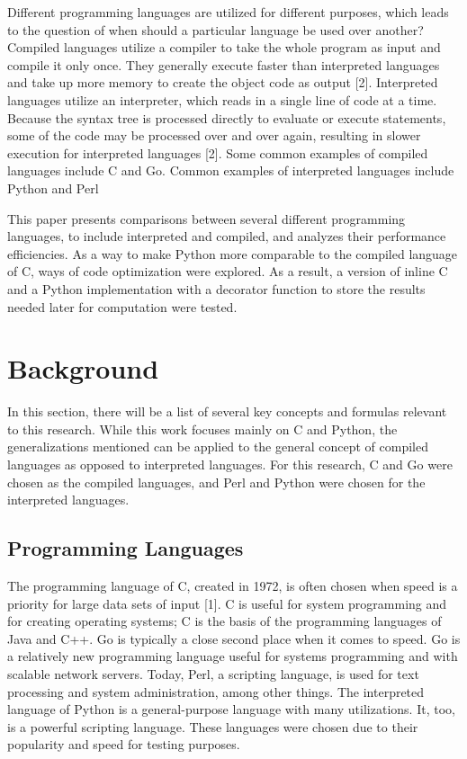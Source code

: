 \documentclass{sig-alternate}
\begin{document}
Different programming languages are utilized for different purposes, which leads to the question of when should a particular language be used over another? Compiled languages utilize a compiler to take the whole program as input and compile it only once. They generally execute faster than interpreted languages and take up more memory to create the object code as output [2]. Interpreted languages utilize an interpreter, which reads in a single line of code at a time. Because the syntax tree is processed directly to evaluate or execute statements, some of the code may be processed over and over again, resulting in slower execution for interpreted languages [2]. Some common examples of compiled languages include C and Go. Common examples of interpreted languages include Python and Perl 

This paper presents comparisons between several different programming languages, to include interpreted and compiled, and analyzes their performance efficiencies. As a way to make Python more comparable to the compiled language of C, ways of code optimization were explored. As a result, a version of inline C and a Python implementation with a decorator function to store the results needed later for computation were tested.

\section{Background}

In this section, there will be a list of several key concepts and formulas relevant to this research. While this work focuses mainly on C and Python, the generalizations mentioned can be applied to the general concept of compiled languages as opposed to interpreted languages. For this research, C and Go were chosen as the compiled languages, and Perl and Python were chosen for the interpreted languages. 

\subsection{Programming Languages}	

The programming language of C, created in 1972, is often chosen when speed is a priority for large data sets of input [1]. C is useful for system programming and for creating operating systems; C is the basis of the programming languages of Java and C++. Go is typically a close second place when it comes to speed. Go is a relatively new programming language useful for systems programming and with scalable network servers. Today, Perl, a scripting language, is used for text processing and system administration, among other things. The interpreted language of Python is a general-purpose language with many utilizations. It, too, is a powerful scripting language. These languages were chosen due to their popularity and speed for testing purposes.
\end{document}
